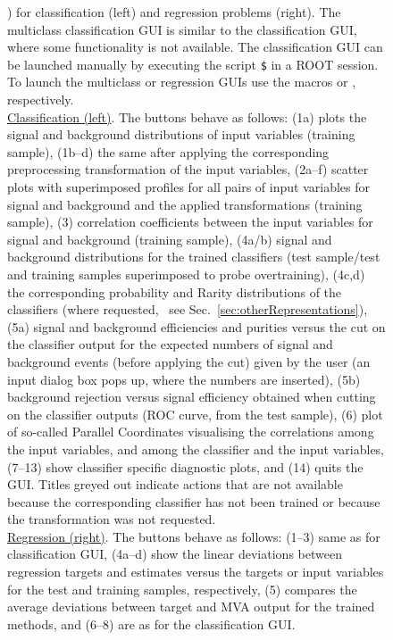 \begin{figure}[p]
{              \pageref{pgr:scripttable1}) for classification (left) and regression
              problems (right). The multiclass classification GUI is similar to the classification GUI,
              where some functionality is not available.
              The classification GUI can be launched manually by executing the script
              {\tt \$} in a ROOT
              session. To launch the multiclass or regression GUIs use the macros 
              or , respectively. \\[0.2cm]
              {\footnotesize
              \underline{Classification (left)}. The buttons behave as follows:
              (1a) plots the signal and background
              distributions of input variables (training sample), (1b--d) the
              same after applying the corresponding preprocessing transformation of the input
              variables, (2a--f) scatter plots with superimposed profiles for all
              pairs of input variables for signal and background and the applied transformations
              (training sample), (3) correlation coefficients
              between the input variables for signal and background (training sample),
              (4a/b) signal and background distributions for the trained classifiers (test
              sample/test and training samples superimposed to probe overtraining),
              (4c,d) the corresponding probability and Rarity distributions of the classifiers
              (where requested, \cf\  see Sec.~\ref{sec:otherRepresentations}),
              (5a) signal and background efficiencies and purities versus the cut on the classifier
              output for the expected numbers of signal and background events (before applying the cut)
              given by the user (an input dialog box pops up, where the numbers are inserted),
              (5b) background rejection versus signal efficiency obtained when cutting
              on the classifier outputs (ROC curve, from the test sample), (6) plot of so-called
              Parallel Coordinates visualising the correlations among the input variables, and
              among the classifier and the input variables,  (7--13) show classifier
              specific diagnostic plots, and (14) quits the GUI. Titles greyed out indicate
              actions that are not available because the corresponding classifier has not
              been trained or because the transformation was not requested.\\
              \underline{Regression (right)}. The buttons behave as follows:
              (1--3) same as for classification GUI, (4a--d) show the linear deviations between
              regression targets and estimates versus the targets or input variables for the
              test and training samples, respectively, (5) compares the average deviations
              between target and MVA output for the trained methods, and (6--8) are as for the classification GUI.}
}
\label{fig:tmvagui}
\end{figure}

